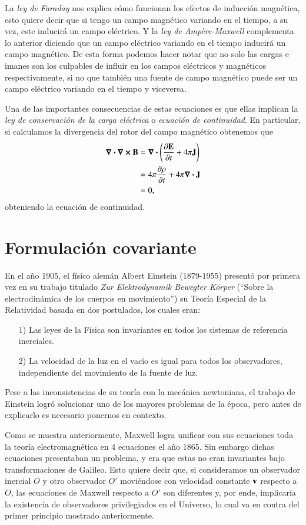 La \textit{ley de Faraday} nos explica cómo funcionan los efectos de inducción magnética, esto quiere decir que si tengo un campo magnético variando en el tiempo, a su vez, este inducirá un campo eléctrico.  Y la \textit{ley de Ampère-Maxwell} complementa lo anterior diciendo que un campo eléctrico variando en el tiempo inducirá un campo magnético. De esta forma podemos hacer notar que no solo las cargas e imanes son los culpables de influir en los campos eléctricos y magnéticos respectivamente, si no que también una fuente de campo magnético puede ser un campo eléctrico variando en el tiempo y viceversa.

Una de las importantes consecuencias de estas ecuaciones es que ellas implican la \textit{ley de conservación de la carga eléctrica} o \textit{ecuación de continuidad}. En particular, si calculamos la divergencia del rotor del campo magnético obtenemos que
\begin{align}
\div{\curl{\vb{B}}} &= \div{ \left( \pdv{\vb{E}}{t} + 4\pi \vb{J} \right) }\\
&= 4\pi \pdv{\rho}{t} + 4\pi \div{\vb{J}}\\
&= 0,
\end{align}
obteniendo la ecuación de continuidad.

\section{Formulación covariante}

En el año 1905, el físico alemán Albert Einstein (1879-1955) presentó por primera vez en su trabajo titulado \textit{Zur Elektrodynamik Bewegter Körper} \cite{Einstein} (``Sobre la electrodinámica de los cuerpos en movimiento'') su Teoría Especial de la Relatividad basada en dos postulados, los cuales eran:
\begin{itemize}
\item[1)] Las leyes de la Física son invariantes en todos los sistemas de referencia inerciales.
\item[2)] La velocidad de la luz en el vacío es igual para todos los observadores, independiente del movimiento de la fuente de luz.
\end{itemize}

Pese a las inconsistencias de su teoría con la mecánica newtoniana, el trabajo de Einstein logró solucionar uno de los mayores problemas de la época, pero antes de explicarlo es necesario ponernos en contexto.

Como se muestra anteriormente, Maxwell logra unificar con sus ecuaciones toda la teoría electromagnética en 4 ecuaciones el año 1865. Sin embargo dichas ecuaciones presentaban un problema, y era que estas no eran invariantes bajo transformaciones de Galileo. Esto quiere decir que, si consideramos un observador inercial $O$ y otro observador $O'$ moviéndose con velocidad constante $\vb{v}$ respecto a $O$, las ecuaciones de Maxwell respecto a $O'$ son diferentes y, por ende, implicaría la existencia de observadores privilegiados en el Universo, lo cual va en contra del primer principio mostrado anteriormente. 

